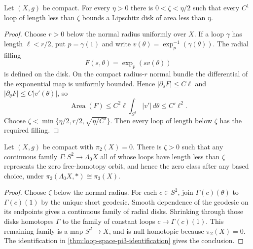 \begin{lemma}
\label{lem:short-loops-small-disk}
\notready
Let $(X,g)$ be compact.  For every $\eta>0$ there is
$0<\zeta<\eta/2$ such that every $C^1$ loop of length less than $\zeta$
bounds a Lipschitz disk of area less than $\eta$.
\end{lemma}

\begin{proof}
Choose $r>0$ below the normal radius uniformly over $X$.  If a loop $\gamma$
has length $\ell<r/2$, put $p=\gamma(1)$ and write
$v(\theta)=\exp_p^{-1}(\gamma(\theta))$.  The radial filling
\[
 F(s,\theta)=\exp_p(sv(\theta))
\]
is defined on the disk.  On the compact radius-$r$ normal bundle the
differential of the exponential map is uniformly bounded.  Hence
$|\partial_sF|\le C\ell$ and
$|\partial_\theta F|\le C|v'(\theta)|$, so
\[
 \operatorname{Area}(F)\le C^2\ell\int_{S^1}|v'|\,d\theta\le C'\ell^2.
\]
Choose
$\zeta<\min\{\eta/2,r/2,\sqrt{\eta/C'}\}$.  Then every loop of length below
$\zeta$ has the required filling.
\end{proof}

\begin{lemma}
\label{lem:short-loop-families-trivial}
\notready
Let $(X,g)$ be compact with $\pi_2(X)=0$.  There is $\zeta>0$ such that any
continuous family $\Gamma\colon S^2\to\Lambda_0X$ all of whose loops have
length less than $\zeta$ represents the zero free-homotopy orbit, and hence
the zero class after any based choice, under
$\pi_2(\Lambda_0X,*)\cong\pi_3(X)$.
\end{lemma}

\begin{proof}
Choose $\zeta$ below the normal radius.  For each $c\in S^2$, join
$\Gamma(c)(\theta)$ to $\Gamma(c)(1)$ by the unique short geodesic.  Smooth
dependence of the geodesic on its endpoints gives a continuous family of
radial disks.  Shrinking through those disks homotopes $\Gamma$ to the family
of constant loops $c\mapsto\Gamma(c)(1)$.  This remaining family is a map
$S^2\to X$, and is null-homotopic because $\pi_2(X)=0$.  The identification
in \ref{thm:loop-space-pi3-identification} gives the conclusion.
\end{proof}

